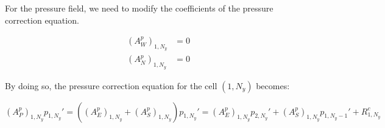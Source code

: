 For the pressure field, we need to modify the coefficients of the pressure correction equation.

\begin{align}
    (A_W^p)_{1, N_y} & = 0 \\
    (A_N^p)_{1, N_y} & = 0
\end{align}

By doing so, the pressure correction equation for the cell $(1, N_y)$ becomes:

\begin{equation}
    (A_P^p)_{1, N_y} p_{1, N_y}' = ((A_E^p)_{1, N_y} + (A_S^p)_{1, N_y}) p_{1, N_y}' = (A_E^p)_{1, N_y} p_{2, N_y}' + (A_S^p)_{1, N_y} p_{1, N_y-1}' + R^c_{1, N_y}
\end{equation}

